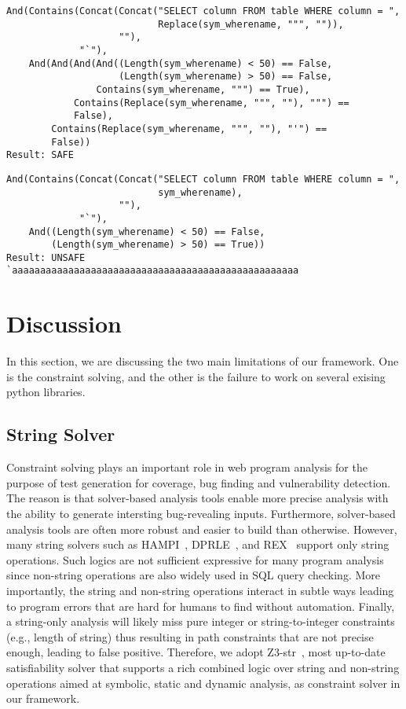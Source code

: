 \documentclass[conference]{IEEEtran}
\begin{document}
\begin{lstlisting}[basicstyle=\footnotesize, frame=single, breaklines=true]
And(Contains(Concat(Concat("SELECT column FROM table WHERE column = ",
                           Replace(sym_wherename, """, "")),
                    ""),
             "`"),
    And(And(And(And((Length(sym_wherename) < 50) == False,
                    (Length(sym_wherename) > 50) == False,
                Contains(sym_wherename, """) == True),
            Contains(Replace(sym_wherename, """, ""), """) ==
            False),
        Contains(Replace(sym_wherename, """, ""), "'") ==
        False))
Result: SAFE
\end{lstlisting}

\begin{lstlisting}[basicstyle=\footnotesize, frame=single, breaklines=true]
And(Contains(Concat(Concat("SELECT column FROM table WHERE column = ",
                           sym_wherename),
                    ""),
             "`"),
    And((Length(sym_wherename) < 50) == False,
        (Length(sym_wherename) > 50) == True))
Result: UNSAFE
`aaaaaaaaaaaaaaaaaaaaaaaaaaaaaaaaaaaaaaaaaaaaaaaaaaa
\end{lstlisting}

\section{Discussion}
\label{discussion}
In this section, we are discussing the two main limitations of our framework. One is the constraint solving, and the other is the failure to work on several exising python libraries.

\subsection{String Solver}
Constraint solving plays an important role in web program analysis for the purpose of test generation for coverage, bug finding and vulnerability detection. The reason is that solver-based analysis tools enable more precise analysis with the ability to generate intersting bug-revealing inputs. Furthermore, solver-based analysis tools are often more robust and easier to build than otherwise. However, many string solvers such as HAMPI~\cite{hampi}, DPRLE~\cite{dprle}, and REX~\cite{rex} support only string operations. Such logics are not sufficient expressive for many program analysis since non-string operations are also widely used in SQL query checking. More importantly, the string and non-string operations interact in subtle ways leading to program errors that are hard for humans to find without automation. Finally, a string-only analysis will likely miss pure integer or string-to-integer constraints (e.g., length of string) thus resulting in path constraints that are not precise enough, leading to false positive. Therefore, we adopt Z3-str~\cite{z3-str}, most up-to-date satisfiability solver that supports a rich combined logic over string and non-string operations aimed at symbolic, static and dynamic analysis, as constraint solver in our framework.
\end{document}
